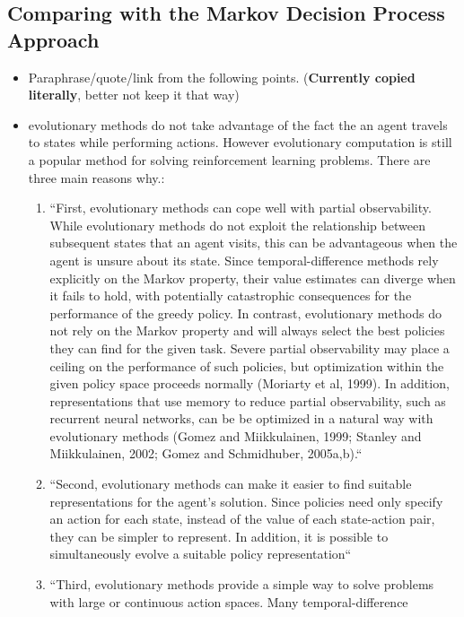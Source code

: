 \begin{itemize}
\subsection{Comparing with the Markov Decision Process Approach}
\begin{itemize}
	\item Paraphrase/quote/link from \citep{Whiteson2012} the following points.
		(\textbf{Currently copied literally}, better not keep it that way)
	\item evolutionary methods do not take advantage of the fact the an agent travels
          to states while performing actions. However evolutionary computation
		  is still a popular method for solving reinforcement learning
		  problems. There are three main reasons why.:
		  \begin{enumerate}
			  \item ``First, evolutionary methods can cope well with
					partial observability. While evolutionary methods do not exploit the relationship
					between subsequent states that an agent visits, this can be advantageous when the
					agent is unsure about its state. Since temporal-difference methods rely explicitly
					on the Markov property, their value estimates can diverge when it fails to hold,
					with potentially catastrophic consequences for the performance of the greedy policy.
					In contrast, evolutionary methods do not rely on the Markov property and will always
					select the best policies they can find for the given task. Severe partial
					observability may place a ceiling on the performance of such policies, but
					optimization within the given policy space proceeds normally (Moriarty et al, 1999).
					In addition, representations that use memory to reduce partial observability,
					such as recurrent neural networks, can be be optimized in a natural way with
					evolutionary methods (Gomez and Miikkulainen, 1999; Stanley and Miikkulainen, 2002;
					Gomez and Schmidhuber, 2005a,b).``
				\item ``Second, evolutionary methods can make it easier to find
					suitable representations for the agent’s solution. Since policies need only specify
					an action for each state, instead of the value of each state-action pair, they can be
					simpler to represent. In addition, it is possible to simultaneously evolve a
					suitable policy representation``
				\item ``Third, evolutionary methods provide a simple way to solve
					problems with large or continuous action spaces. Many temporal-difference

\end{enumerate}
\end{itemize}
\end{itemize}
